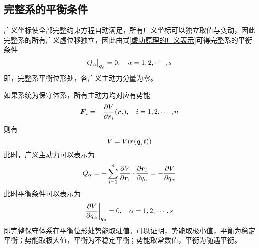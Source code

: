 \subsection{完整系的平衡条件}

广义坐标使全部完整约束方程自动满足，所有广义坐标可以独立取值与变动，因此完整系的所有广义虚位移独立，因此由式\eqref{虚功原理的广义表示}可得完整系的平衡条件
\begin{equation}
	Q_\alpha\big|_{\boldsymbol{q}_0} = 0,\quad \alpha =1,2,\cdots,s
\end{equation}
即，完整系平衡位形处，各广义主动力分量为零。

如果系统为保守体系，所有主动力均对应有势能
\begin{equation}
	\boldsymbol{F}_i = -\frac{\partial V}{\partial \boldsymbol{r}_i}(\boldsymbol{r}_i),\quad i=1,2,\cdots,n
\end{equation}
则有
\begin{equation*}
	V = V(\boldsymbol{r}(\boldsymbol{q},t))
\end{equation*}
此时，广义主动力可以表示为
\begin{equation}
	Q_\alpha = -\sum_{i=1}^n \frac{\partial V}{\partial \boldsymbol{r}_i} \cdot \frac{\partial \boldsymbol{r}_i}{\partial q_\alpha} = -\frac{\partial V}{\partial q_\alpha}
\end{equation}
此时平衡条件可以表示为
\begin{equation}
	\frac{\partial V}{\partial q_\alpha}\bigg|_{\boldsymbol{q}_0} = 0,\quad \alpha = 1,2,\cdots,s
\end{equation}
即完整保守体系在平衡位形处势能取驻值。可以证明，势能取极小值，平衡为{\heiti 稳定平衡}；势能取极大值，平衡为{\heiti 不稳定平衡}；势能取常数值，平衡为{\heiti 随遇平衡}。

